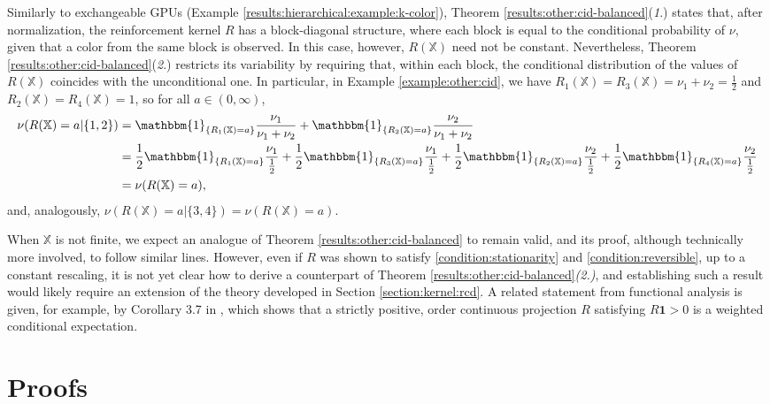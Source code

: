 \documentclass[a4paper]{article}
\theoremstyle{plain}
\theoremstyle{remark}
\theoremstyle{definition}
\begin{document}
Similarly to exchangeable GPUs (Example \ref{results:hierarchical:example:k-color}), Theorem \ref{results:other:cid-balanced}(\textit{1}.) states that, after normalization, the reinforcement kernel $R$ has a block-diagonal structure, where each block is equal to the conditional probability of $\nu$, given that a color from the same block is observed. In this case, however, $R(\mathbb{X})$ need not be constant. Nevertheless, Theorem \ref{results:other:cid-balanced}(\textit{2}.) restricts its variability by requiring that, within each block, the conditional distribution of the values of $R(\mathbb{X})$ coincides with the unconditional one. In particular, in Example \ref{example:other:cid}, we have $R_1(\mathbb{X})=R_3(\mathbb{X})=\nu_1+\nu_2=\frac{1}{2}$ and $R_2(\mathbb{X})=R_4(\mathbb{X})=1$, so for all $a\in(0,\infty)$,
\begingroup\allowdisplaybreaks
\begin{align*}
\nu(R(\mathbb{X})=a|\{1,2\})&=\mathbbm{1}_{\{R_1(\mathbb{X})=a\}}\frac{\nu_1}{\nu_1+\nu_2}+\mathbbm{1}_{\{R_2(\mathbb{X})=a\}}\frac{\nu_2}{\nu_1+\nu_2}\\
&=\frac{1}{2}\mathbbm{1}_{\{R_1(\mathbb{X})=a\}}\frac{\nu_1}{\frac{1}{2}}+\frac{1}{2}\mathbbm{1}_{\{R_3(\mathbb{X})=a\}}\frac{\nu_1}{\frac{1}{2}}+\frac{1}{2}\mathbbm{1}_{\{R_2(\mathbb{X})=a\}}\frac{\nu_2}{\frac{1}{2}}+\frac{1}{2}\mathbbm{1}_{\{R_4(\mathbb{X})=a\}}\frac{\nu_2}{\frac{1}{2}}\\
&=\nu(R(\mathbb{X})=a),
\end{align*}
\endgroup
and, analogously, $\nu(R(\mathbb{X})=a|\{3,4\})=\nu(R(\mathbb{X})=a)$.

When $\mathbb{X}$ is not finite, we expect an analogue of Theorem \ref{results:other:cid-balanced} to remain valid, and its proof, although technically more involved, to follow similar lines. However, even if $R$ was shown to satisfy \eqref{condition:stationarity} and \eqref{condition:reversible}, up to a constant rescaling, it is not yet clear how to derive a counterpart of Theorem \ref{results:other:cid-balanced}\textit{(2.)}, and establishing such a result would likely require an extension of the theory developed in Section \ref{section:kernel:rcd}. A related statement from functional analysis is given, for example, by Corollary 3.7 in \cite{dodds1990}, which shows that a strictly positive, order continuous projection $R$ satisfying $R\textbf{1}>0$ is a weighted conditional expectation.

\section{Proofs}\label{section:proofs}
\end{document}
